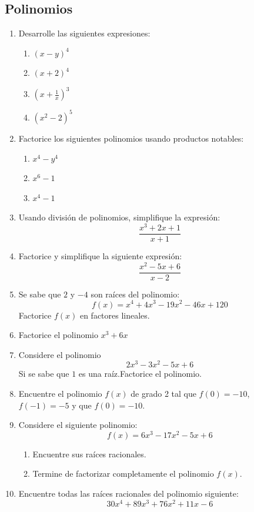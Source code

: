 \documentclass[11pt, twoside]{memoir}
\begin{document}
\subsection*{Polinomios}
\begin{enumerate}
    \item Desarrolle las siguientes expresiones:
        \begin{enumerate}
            \item \((x-y)^4\)
            \item \((x+2)^4\)
            \item \(\left(x+\frac{1}{x}\right)^3\)
            \item \((x^2-2)^5\)
        \end{enumerate}
    \item Factorice los siguientes polinomios usando productos notables:
            \begin{enumerate}
                \item \(x^4-y^4\)
                \item \(x^6-1\)
                \item \(x^4-1\)
            \end{enumerate}
    \item Usando división de polinomios, simplifique la expresión:
        \[\frac{x^3+2x+1}{x+1}\]
    \item Factorice y simplifique la siguiente expresión:
        \[\frac{x^2-5x+6}{x-2}\]
    \item Se sabe que \(2\) y \(-4\) son raíces del polinomio:
        \[f(x)=x^4+4x^3-19x^2-46x+120\]
        Factorice \(f(x)\) en factores lineales.
    \item Factorice el polinomio
        \(x^3+6x\)
    \item Considere el polinomio
        \[2x^3-3x^2-5x+6\]
        Si se sabe que \(1\) es una raíz.Factorice el polinomio.
    \item Encuentre el polinomio \(f(x)\) de grado 2 tal que \(f(0)=-10\), \(f(-1)=-5\) y que \(f(0)=-10\).
    \item Considere el siguiente polinomio:
        \[f(x)=6x^3-17x^2-5x+6\]
        \begin{enumerate}
            \item Encuentre sus raíces racionales.
            \item Termine de factorizar completamente el polinomio \(f(x)\).
        \end{enumerate}
    \item Encuentre todas las raíces racionales del polinomio siguiente:
        \[30x^4 + 89x^3 + 76x^2 + 11x - 6\]
\end{enumerate}
\end{document}
